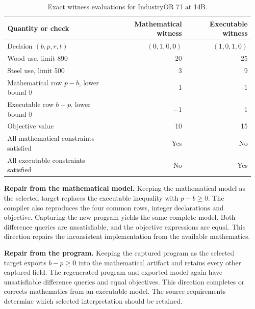 \begin{table}[htbp]
\caption{Exact witness evaluations for IndustryOR 71 at 14B.}
\label{tab:industrywitnesses}
\centering\small\setlength{\tabcolsep}{4pt}
\begin{tabular*}{\textwidth}{@{\extracolsep{\fill}}lrr@{}}
\toprule
Quantity or check & Mathematical witness & Executable witness\\
\midrule
Decision \((b,p,r,t)\) & \((0,1,0,0)\) & \((1,0,1,0)\)\\
Wood use, limit 890 & 20 & 25\\
Steel use, limit 500 & 3 & 9\\
Mathematical row \(p-b\), lower bound 0 & 1 & \(-1\)\\
Executable row \(b-p\), lower bound 0 & \(-1\) & 1\\
Objective value & 10 & 15\\
All mathematical constraints satisfied & Yes & No\\
All executable constraints satisfied & No & Yes\\
\bottomrule
\end{tabular*}
\end{table}

\textbf{Repair from the mathematical model.} Keeping the mathematical model as the selected
target replaces the executable inequality with \(p-b\geq0\). The compiler also reproduces the
four common rows, integer declarations and objective. Capturing the new program yields the same
complete model. Both difference queries are unsatisfiable, and the objective expressions are equal.
This direction repairs the inconsistent implementation from the available mathematics.

\textbf{Repair from the program.} Keeping the captured program as the selected target exports
\(b-p\geq0\) into the mathematical artifact and retains every other captured field. The regenerated
program and exported model again have unsatisfiable difference queries and equal objectives.
This direction completes or corrects mathematics from an executable model. The source requirements
determine which selected interpretation should be retained.

